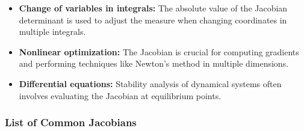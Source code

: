 \begin{itemize}
  
    \item \textbf{Change of variables in integrals:} The absolute value of the Jacobian determinant is 
          used to adjust the measure when changing coordinates in multiple integrals.
  
    \item \textbf{Nonlinear optimization:} The Jacobian is crucial for computing gradients and 
          performing techniques like Newton's method in multiple dimensions.
  
    \item \textbf{Differential equations:} Stability analysis of dynamical systems often involves 
          evaluating the Jacobian at equilibrium points.

\end{itemize}

\subsubsection{List of Common Jacobians}

